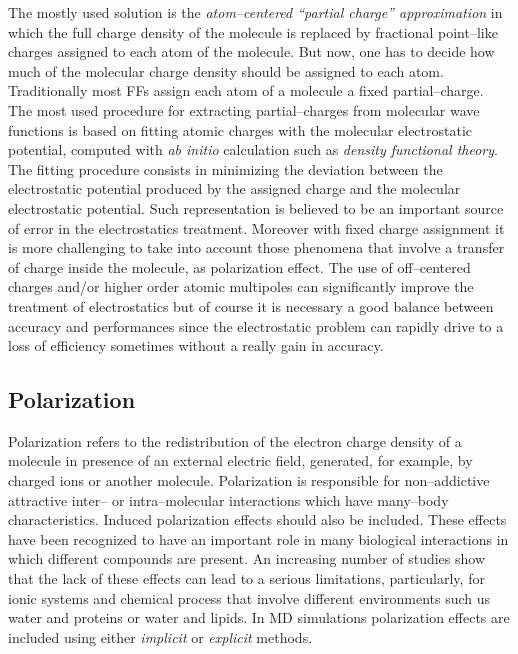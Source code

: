 The mostly used solution is the \textit{atom--centered ``partial charge'' approximation} in which the full charge density of the molecule is replaced by fractional point--like charges assigned to each atom of the molecule. But now, one has to decide how much of the molecular charge density should be assigned to each atom. Traditionally most \acp{FF} assign each atom of a molecule a fixed partial--charge. The most used procedure for extracting partial--charges from molecular wave functions is based on fitting atomic charges with the molecular electrostatic potential, computed with \textit{ab initio} calculation such as \textit{density functional theory}. The fitting procedure consists in minimizing the deviation between the electrostatic potential produced by the assigned charge and the molecular electrostatic potential. Such representation is believed to be an important source of error in the electrostatics treatment. Moreover with fixed charge assignment it is more challenging to take into account those phenomena that involve a transfer of charge inside the molecule, as polarization effect. The use of off--centered charges and/or higher order atomic multipoles can significantly improve the treatment of electrostatics but of course it is necessary a good balance between accuracy and performances since the electrostatic problem can rapidly drive to a loss of efficiency sometimes without a really gain in accuracy.

\subsection{Polarization}
\label{sec:polarization}
Polarization refers to the redistribution of the electron charge density of a molecule in presence of an external electric field, generated, for example, by charged ions or another molecule. Polarization is responsible for non--addictive attractive inter-- or intra--molecular interactions which have many--body characteristics. Induced polarization effects should also be included. These effects have been recognized to have an important role in many biological interactions in which different compounds are present. An increasing number of studies show that the lack of these effects can lead to a serious limitations, particularly, for ionic systems and chemical process that involve different environments such us water and proteins or water and lipids. In \ac{MD} simulations polarization effects are included using either \textit{implicit} or \textit{explicit} methods.

